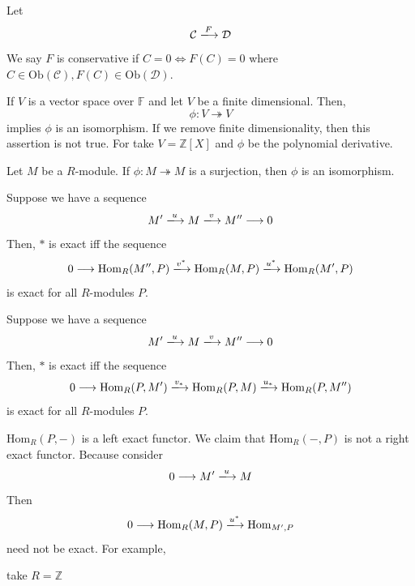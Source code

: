 \documentclass[oneside, 12pt]{scrbook}
\newcommand{\ZZ}{\mathbb Z}
\newcommand{\Hom}{\mathrm{Hom}}
\theoremstyle{theorem}
\begin{document}
\begin{definition}
Let \begin{equation}
\mathcal{C} \xlongrightarrow{F} \mathcal{D}
\end{equation}
We say $F$ is conservative if $C=0 \Leftrightarrow F(C)=0$ where $C \in \mathrm{Ob}(\mathcal{C}), F(C) \in \mathrm{Ob}(\mathcal{D})$.
\end{definition}

If $V$ is a vector space over $\mathbb{F}$ and let $V$ be a finite dimensional. Then, $$\phi : V \twoheadrightarrow V$$ implies $\phi$ is an isomorphism. If we remove finite dimensionality, then this assertion is not true. For take $V=\ZZ[X]$ and $\phi$ be the polynomial derivative.

\begin{theorem}
Let $M$ be a $R$-module. If $\phi : M \twoheadrightarrow M$ is a surjection, then $\phi$ is an isomorphism.
\end{theorem} 

\begin{lemma}

\end{lemma}

\begin{lemma}
Suppose we have a sequence 
\begin{equation}[*]
M' \xlongrightarrow{u} M \xlongrightarrow{v} M'' \longrightarrow 0
\end{equation}
Then, $*$ is exact iff the sequence 
\begin{equation}[*]
0 \longrightarrow \Hom_{R}(M '' , P) \xlongrightarrow{v^*} \Hom_{R}(M,P) \xlongrightarrow{u^*} \Hom_{R}(M',P)
\end{equation}
is exact for all $R$-modules $P$.
\end{lemma}

\begin{lemma}
Suppose we have a sequence 
\begin{equation}[*]
M' \xlongrightarrow{u} M \xlongrightarrow{v} M'' \longrightarrow 0
\end{equation}
Then, $*$ is exact iff the sequence 
\begin{equation}[*]
0 \longrightarrow \Hom_{R}(P,M') \xlongrightarrow{v_*} \Hom_{R}(P,M) \xlongrightarrow{u_*} \Hom_{R}(P,M'')
\end{equation}
is exact for all $R$-modules $P$.
\end{lemma}

\begin{remark}
$\Hom_{R}(P, -)$ is a left exact functor. We claim that $\Hom_{R}(- , P)$ is not a right exact functor. Because consider 
\begin{equation}
0 \longrightarrow M' \xlongrightarrow{u} M 
\end{equation}
Then \begin{equation}
0 \longrightarrow \Hom_{R}(M,P) \xlongrightarrow{u^*} \Hom_{M',P}
\end{equation}
need not be exact. For example, 

take  $R=\ZZ$
\end{remark}
\end{document}
